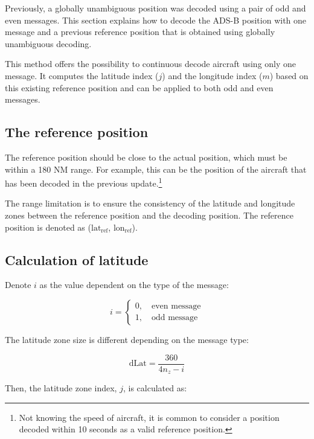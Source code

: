 Previously, a globally unambiguous position was decoded using a pair of odd and even messages. This section explains how to decode the ADS-B position with one message and a previous reference position that is obtained using globally unambiguous decoding.

This method offers the possibility to continuous decode aircraft using only one message. It computes the latitude index ($j$) and the longitude index ($m$) based on this existing reference position and can be applied to both odd and even messages.

\subsection{The reference position}

The reference position should be close to the actual position, which must be within a 180 NM range. For example, this can be the position of the aircraft that has been decoded in the previous update.\footnote{Not knowing the speed of aircraft, it is common to consider a position decoded within 10 seconds as a valid reference position.} 

The range limitation is to ensure the consistency of the latitude and longitude zones between the reference position and the decoding position. The reference position is denoted as ($\mathrm{lat}_\mathrm{ref}$, $\mathrm{lon}_\mathrm{ref}$).

\subsection{Calculation of latitude}

Denote $i$ as the value dependent on the type of the message:

\begin{equation}
  i =
  \begin{cases}
    0, \quad \text{even message} \\
    1, \quad \text{odd message}
  \end{cases}
\end{equation}

\noindent The latitude zone size is different depending on the message type:

\begin{equation}
  \mathrm{dLat} = \frac{360}{4n_z-i}
\end{equation}

Then, the latitude zone index, $j$, is calculated as:

